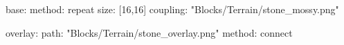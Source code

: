 base:
  method: repeat
  size: [16,16]
  coupling: "Blocks/Terrain/stone_mossy.png"

overlay:
  path: "Blocks/Terrain/stone_overlay.png"
  method: connect
